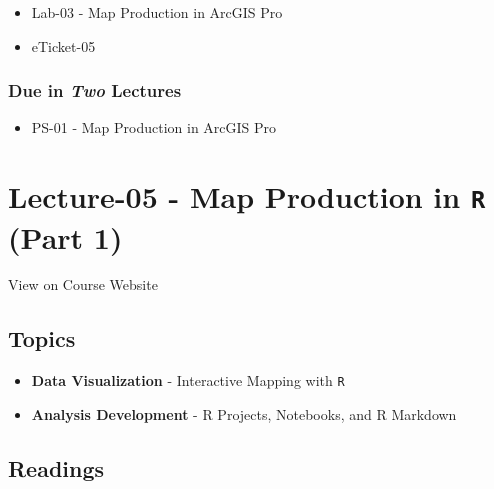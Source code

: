 \documentclass[]{book}
\providecommand{\tightlist}{%
  \setlength{\itemsep}{0pt}\setlength{\parskip}{0pt}}
\begin{document}
\begin{itemize}
\tightlist
\item
  Lab-03 - Map Production in ArcGIS Pro
\item
  eTicket-05
\end{itemize}

\hypertarget{due-in-two-lectures}{%
\subsubsection*{\texorpdfstring{Due in \emph{Two} Lectures}{Due in Two Lectures}}\label{due-in-two-lectures}}

\begin{itemize}
\tightlist
\item
  PS-01 - Map Production in ArcGIS Pro
\end{itemize}

\hypertarget{lecture-05---map-production-in-r-part-1}{%
\section*{\texorpdfstring{Lecture-05 - Map Production in \texttt{R} (Part 1)}{Lecture-05 - Map Production in R (Part 1)}}\label{lecture-05---map-production-in-r-part-1}}

View on Course Website

\hypertarget{topics-5}{%
\subsection*{Topics}\label{topics-5}}

\begin{itemize}
\tightlist
\item
  \textbf{Data Visualization} - Interactive Mapping with \texttt{R}
\item
  \textbf{Analysis Development} - R Projects, Notebooks, and R Markdown
\end{itemize}

\hypertarget{readings-6}{%
\subsection*{Readings}\label{readings-6}}
\end{document}
